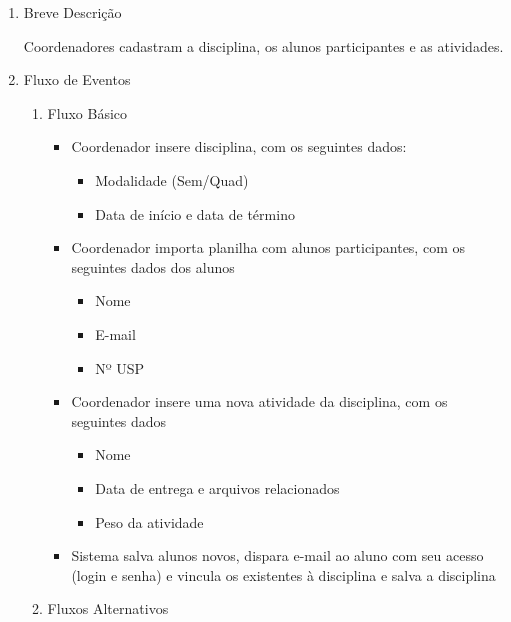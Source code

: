 \begin{enumerate}
    \item Breve Descrição


Coordenadores cadastram a disciplina, os alunos participantes e as atividades.


    \item Fluxo de Eventos

\begin{enumerate}
    \item Fluxo Básico

\begin{itemize}
    \item Coordenador insere disciplina, com os seguintes dados:

\begin{itemize}
    \item Modalidade (Sem/Quad)

    \item Data de início e data de término


\end{itemize}
    \item Coordenador importa planilha com alunos participantes, com os seguintes dados dos alunos

\begin{itemize}
    \item Nome

    \item E-mail

    \item Nº USP


\end{itemize}
    \item Coordenador insere uma nova atividade da disciplina, com os seguintes dados

\begin{itemize}
    \item Nome

    \item Data de entrega e arquivos relacionados

    \item Peso da atividade


\end{itemize}
    \item Sistema salva alunos novos, dispara e-mail ao aluno com seu acesso (login e senha) e vincula os existentes à disciplina e salva a disciplina
\end{itemize}

    \item Fluxos Alternativos


\end{enumerate}
\end{enumerate}
